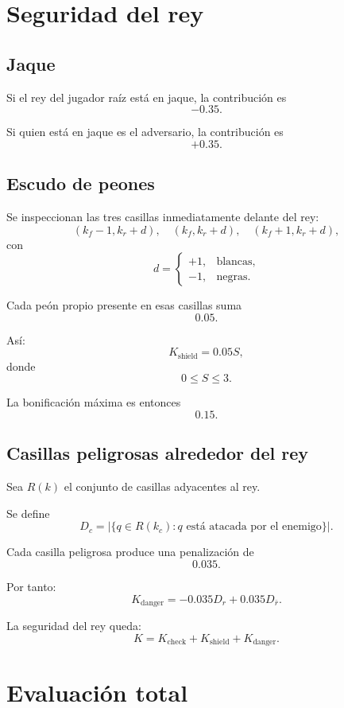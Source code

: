 \documentclass[11pt,a4paper]{article}
\begin{document}
\section{Seguridad del rey}

\subsection{Jaque}

Si el rey del jugador raíz está en jaque, la contribución es
\[
-0.35.
\]

Si quien está en jaque es el adversario, la contribución es
\[
+0.35.
\]

\subsection{Escudo de peones}

Se inspeccionan las tres casillas inmediatamente delante del rey:
\[
(k_f-1,k_r+d),\quad
(k_f,k_r+d),\quad
(k_f+1,k_r+d),
\]
con
\[
d=
\begin{cases}
+1, & \text{blancas},\\
-1, & \text{negras}.
\end{cases}
\]

Cada peón propio presente en esas casillas suma
\[
0.05.
\]

Así:
\[
K_{\mathrm{shield}}=0.05S,
\]
donde
\[
0\le S\le3.
\]

La bonificación máxima es entonces
\[
0.15.
\]

\subsection{Casillas peligrosas alrededor del rey}

Sea $R(k)$ el conjunto de casillas adyacentes al rey.

Se define
\[
D_c
=
|\{q\in R(k_c):q\text{ está atacada por el enemigo}\}|.
\]

Cada casilla peligrosa produce una penalización de
\[
0.035.
\]

Por tanto:
\[
K_{\mathrm{danger}}
=
-0.035D_r
+
0.035D_{\bar r}.
\]

La seguridad del rey queda:
\[
K=
K_{\mathrm{check}}
+
K_{\mathrm{shield}}
+
K_{\mathrm{danger}}.
\]

\section{Evaluación total}
\end{document}
